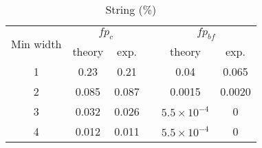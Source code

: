 \documentclass[11pt, twocolumn]{article}
\begin{document}
\begin{table}[ht]
\caption{String (\%)} 
\centering 
\begin{tabular}{cccccc} %
\toprule
\multirow{2}{*}{
\parbox[c]{.2\linewidth}{\centering Min width}}
  & \multicolumn{2}{c}{$fp_{c}$} &&
\multicolumn{2}{c}{$fp_{bf}$} \\ 
\cmidrule{2-3} \cmidrule{5-6}

 & {\centering theory} & {exp.} && {theory} & {exp.}  \\
\midrule
1 & 0.23  & 0.21  && 0.04               & 0.065 \\
2 & 0.085 & 0.087 && 0.0015             & 0.0020 \\
3 & 0.032 & 0.026 && $5.5\times10^{-4}$ & 0 \\
4 & 0.012 & 0.011 && $5.5\times10^{-4}$ & 0 \\
\bottomrule
\end{tabular}
\end{table}
\end{document}
